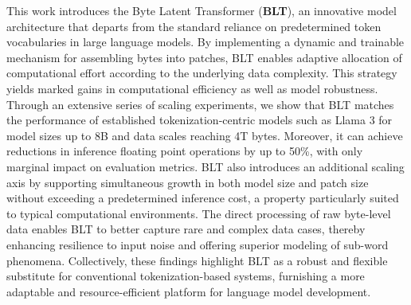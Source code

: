 This work introduces the Byte Latent Transformer (\textbf{BLT}), an innovative model architecture that departs from the standard reliance on predetermined token vocabularies in large language models. By implementing a dynamic and trainable mechanism for assembling bytes into patches, {\textsc BLT} enables adaptive allocation of computational effort according to the underlying data complexity. This strategy yields marked gains in computational efficiency as well as model robustness. Through an extensive series of scaling experiments, we show that {\textsc BLT} matches the performance of established tokenization-centric models such as Llama 3 for model sizes up to 8B and data scales reaching 4T bytes. Moreover, it can achieve reductions in inference floating point operations by up to 50\%, with only marginal impact on evaluation metrics. {\textsc BLT} also introduces an additional scaling axis by supporting simultaneous growth in both model size and patch size without exceeding a predetermined inference cost, a property particularly suited to typical computational environments. The direct processing of raw byte-level data enables {\textsc BLT} to better capture rare and complex data cases, thereby enhancing resilience to input noise and offering superior modeling of sub-word phenomena. Collectively, these findings highlight {\textsc BLT} as a robust and flexible substitute for conventional tokenization-based systems, furnishing a more adaptable and resource-efficient platform for language model development.

